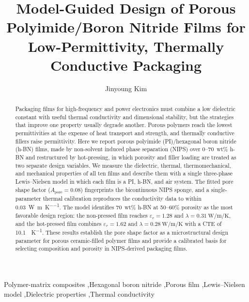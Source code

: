 \documentclass[preprint,a4paper]{elsarticle}
\newcommand{\eps}{\ensuremath{\varepsilon_r}}   %
\newcommand{\lam}{\ensuremath{\lambda}}
\newcommand{\Apore}{\ensuremath{A_{\mathrm{pore}}}}
\newcommand{\hl}[1]{\textcolor{orange}{\textbf{[#1]}}}
\begin{document}

\begin{frontmatter}

\title{Model-Guided Design of Porous Polyimide/Boron Nitride Films for Low-Permittivity, Thermally Conductive Packaging}

\author[gt]{Jinyoung Kim}
\cortext[cor1]{Corresponding author. E-mail: \hl{e-mail address}}


\begin{abstract}
Packaging films for high-frequency and power electronics must combine a low dielectric constant with useful thermal conductivity and dimensional stability, but the strategies that improve one property usually degrade another. Porous polymers reach the lowest permittivities at the expense of heat transport and strength, and thermally conductive fillers raise permittivity. Here we report porous polyimide (PI)/hexagonal boron nitride (h-BN) films, made by non-solvent induced phase separation (NIPS) over 0--70~wt\% h-BN and restructured by hot-pressing, in which porosity and filler loading are treated as two separate design variables. We measure the dielectric, thermal, thermomechanical, and mechanical properties of all ten films and describe them with a single three-phase Lewis--Nielsen model in which each film is a PI, h-BN, and air system. The fitted pore shape factor ($\Apore = 0.08$) fingerprints the bicontinuous NIPS sponge, and a single-parameter thermal calibration reproduces the conductivity data to within \SI{0.03}{\watt\per\meter\per\kelvin}. The model identifies 70~wt\% h-BN at 50--60\% porosity as the most favorable design region: the non-pressed film reaches $\eps = 1.28$ and $\lam = \SI{0.31}{\watt\per\meter\per\kelvin}$, and the hot-pressed film combines $\eps = 1.62$ and $\lam = \SI{0.28}{\watt\per\meter\per\kelvin}$ with a CTE of \SI{10.1}{\ppm\per\kelvin}. These results establish the pore shape factor as a microstructural design parameter for porous ceramic-filled polymer films and provide a calibrated basis for selecting composition and porosity in NIPS-derived packaging films.
\end{abstract}

\begin{keyword}
Polymer-matrix composites \sep Hexagonal boron nitride \sep Porous film \sep Lewis--Nielsen model \sep Dielectric properties \sep Thermal conductivity
\end{keyword}

\end{frontmatter}
\end{document}
